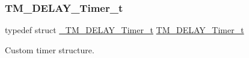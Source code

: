 \subsubsection{\texorpdfstring{T\+M\+\_\+\+D\+E\+L\+A\+Y\+\_\+\+Timer\+\_\+t}{TM\_DELAY\_Timer\_t}}
{\footnotesize\ttfamily typedef struct \hyperlink{struct___t_m___d_e_l_a_y___timer__t}{\+\_\+\+T\+M\+\_\+\+D\+E\+L\+A\+Y\+\_\+\+Timer\+\_\+t}  \hyperlink{group___t_m___d_e_l_a_y___typedefs_gaf0beeb077a757f34c8b176464d9a0e85}{T\+M\+\_\+\+D\+E\+L\+A\+Y\+\_\+\+Timer\+\_\+t}}



Custom timer structure. 

